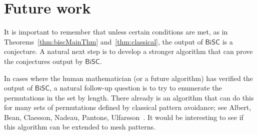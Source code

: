 \documentclass[a4paper]{article}
\newcommand{\bisc}{\mathsf{BiSC}}
\begin{document}
\section{Future work}

It is important to remember that unless certain conditions are met, as in Theorems~\ref{thm:biscMainThm} and~\ref{thm:classical},
the output of $\bisc$ is a conjecture. A natural next step is to develop a stronger algorithm
that can prove the conjectures output by $\bisc$.

In cases where the human mathematician (or a future algorithm) has verified the output
of $\bisc$, a natural follow-up question is to try to enumerate the permutations in the
set by length. There already is an algorithm that can do this for many sets of permutations
defined by classical pattern avoidance; see Albert, Bean, Claesson, Nadeau, Pantone, Ulfarsson~\cite{combinatorial-exploration}. It would be interesting to see if
this algorithm can be extended to mesh patterns.



\end{document}
